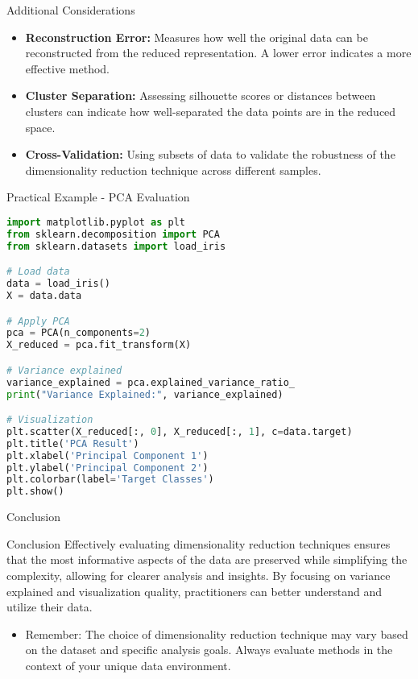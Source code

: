 \documentclass[aspectratio=169]{beamer}
\begin{document}
\begin{frame}{Additional Considerations}
  \begin{itemize}
    \item \textbf{Reconstruction Error:} Measures how well the original data can be reconstructed from the reduced representation. A lower error indicates a more effective method.
    \item \textbf{Cluster Separation:} Assessing silhouette scores or distances between clusters can indicate how well-separated the data points are in the reduced space.
    \item \textbf{Cross-Validation:} Using subsets of data to validate the robustness of the dimensionality reduction technique across different samples.
  \end{itemize}
\end{frame}

\begin{frame}[fragile]{Practical Example - PCA Evaluation}
  \begin{lstlisting}[language=Python]
import matplotlib.pyplot as plt
from sklearn.decomposition import PCA
from sklearn.datasets import load_iris

# Load data
data = load_iris()
X = data.data

# Apply PCA
pca = PCA(n_components=2)
X_reduced = pca.fit_transform(X)

# Variance explained
variance_explained = pca.explained_variance_ratio_
print("Variance Explained:", variance_explained)

# Visualization
plt.scatter(X_reduced[:, 0], X_reduced[:, 1], c=data.target)
plt.title('PCA Result')
plt.xlabel('Principal Component 1')
plt.ylabel('Principal Component 2')
plt.colorbar(label='Target Classes')
plt.show()
  \end{lstlisting}
\end{frame}

\begin{frame}{Conclusion}
  \begin{block}{Conclusion}
    Effectively evaluating dimensionality reduction techniques ensures that the most informative aspects of the data are preserved while simplifying the complexity, allowing for clearer analysis and insights. By focusing on variance explained and visualization quality, practitioners can better understand and utilize their data.
  \end{block}
  
  \begin{itemize}
    \item Remember: The choice of dimensionality reduction technique may vary based on the dataset and specific analysis goals. Always evaluate methods in the context of your unique data environment.
  \end{itemize}
\end{frame}
\end{document}
